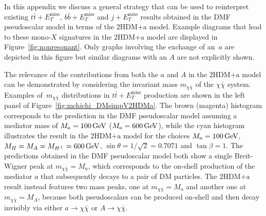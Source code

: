 \documentclass[review]{elsarticle}
\newcommand{\MET}{\ensuremath{E_T^\mathrm{miss}}\xspace}
\newcommand{\mA}{\ensuremath{M_{A}}\xspace}
\newcommand{\ma}{\ensuremath{M_{a}}\xspace}
\newcommand{\mH}{\ensuremath{M_{H}}\xspace}
\newcommand{\mHc}{\ensuremath{M_{H^{\pm}}}\xspace}
\newcommand{\hdma}{\ensuremath{\textrm{2HDM+a}}\xspace}
\begin{document}
In this appendix we discuss  a general strategy that can be used to reinterpret existing $t \bar t + \MET$, $b \bar b + \MET$ and $j + \MET$ results obtained in the DMF pseudoscalar model in terms of the \hdma model. Example diagrams that lead to these mono-$X$ signatures in the \hdma model are displayed in Figure~\ref{fig:nonresonant}. Only graphs involving the exchange of an~$a$ are depicted in this figure but similar diagrams  with an  $A$ are not explicitly shown. 

 The relevance of the contributions from both the $a$ and $A$ in the \hdma model can be  demonstrated by considering the invariant mass $m_{\chi \bar \chi}$ of the $\chi \bar \chi$ system. Examples of~$m_{\chi \bar \chi}$ distributions in $t \bar t + \MET$ production are shown in the left panel of Figure~\ref{fig:mchichi_DMsimpV2HDMa}. The brown (magenta) histogram corresponds to the prediction in the DMF pseudoscalar model assuming a mediator mass of $\ma =100 \, {\rm  GeV}$ ($\ma =600 \, {\rm  GeV}$), while the cyan histogram illustrates the result in the \hdma model for the choices $\ma = 100 \, {\rm  GeV}$, $\mH = \mA = \mHc = 600 \, {\rm  GeV}$, $\sin\theta=1/\sqrt{2}=0.7071$ and $\tan\beta=1$. The predictions obtained in the  DMF pseudoscalar model both show a single  Breit-Wigner  peak  at $m_{\chi \bar \chi} = \ma$, which corresponds to the on-shell production of the mediator $a$ that subsequently decays to a pair of DM particles. The \hdma result instead features two mass peaks, one at $m_{\chi \bar \chi} = \ma$ and another one at $m_{\chi \bar \chi} = \mA$, because both pseudoscalars can be produced on-shell and then decay invisibly via either $a \to \chi \bar \chi$ or $A \to \chi \bar \chi$.  
\end{document}
